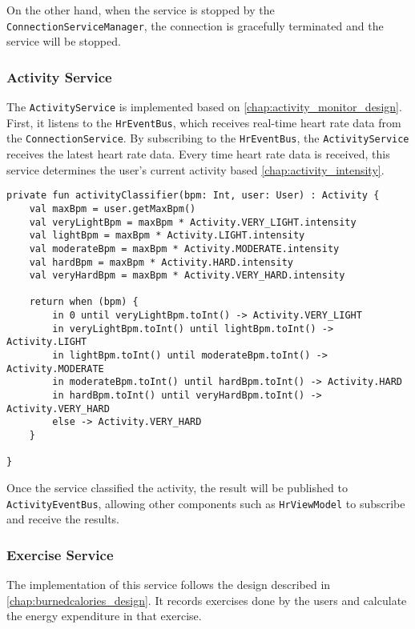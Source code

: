 On the other hand, when the service is stopped by the \verb;ConnectionServiceManager;, the connection is gracefully terminated and the service will be stopped.

\subsubsection{Activity Service}
The \verb;ActivityService; is implemented based on \autoref{chap:activity_monitor_design}.
First, it listens to the \verb;HrEventBus;, which receives real-time heart rate data from the \verb;ConnectionService;. 
By subscribing to the \verb;HrEventBus;, the \verb;ActivityService; receives the latest heart rate data.
Every time heart rate data is received, this service determines the user's current activity based \autoref{chap:activity_intensity}.
\begin{lstlisting}[caption={Activity classifier (Kotlin - ActivityService)}]
private fun activityClassifier(bpm: Int, user: User) : Activity {
    val maxBpm = user.getMaxBpm()
    val veryLightBpm = maxBpm * Activity.VERY_LIGHT.intensity
    val lightBpm = maxBpm * Activity.LIGHT.intensity
    val moderateBpm = maxBpm * Activity.MODERATE.intensity
    val hardBpm = maxBpm * Activity.HARD.intensity
    val veryHardBpm = maxBpm * Activity.VERY_HARD.intensity

    return when (bpm) {
        in 0 until veryLightBpm.toInt() -> Activity.VERY_LIGHT
        in veryLightBpm.toInt() until lightBpm.toInt() -> Activity.LIGHT
        in lightBpm.toInt() until moderateBpm.toInt() -> Activity.MODERATE
        in moderateBpm.toInt() until hardBpm.toInt() -> Activity.HARD
        in hardBpm.toInt() until veryHardBpm.toInt() -> Activity.VERY_HARD
        else -> Activity.VERY_HARD
    }

}
\end{lstlisting}

Once the service classified the activity, the result will be published to \verb;ActivityEventBus;, allowing other components such as \verb;HrViewModel; to subscribe and receive the results.

\subsubsection{Exercise Service}
The implementation of this service follows the design described in \autoref{chap:burnedcalories_design}.
It records exercises done by the users and calculate the energy expenditure in that exercise.

